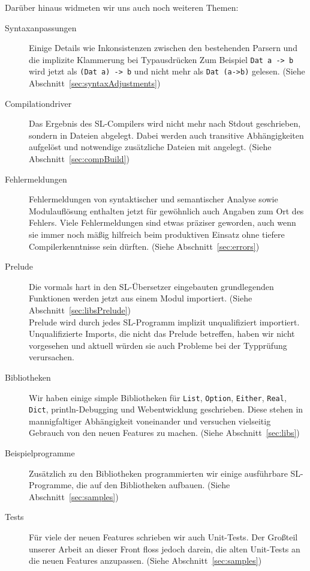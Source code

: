 \documentclass[runningheads]{llncs}
\begin{document}
Darüber hinaus widmeten wir uns auch noch weiteren Themen:

\begin{description}
 \item[Syntaxanpassungen] Einige Details wie Inkonsistenzen zwischen den
   bestehenden Parsern und die implizite Klammerung bei Typausdrücken
   Zum Beispiel \verb|Dat a -> b| wird jetzt als \verb|(Dat a) -> b| und
   nicht mehr als \verb|Dat (a->b)| gelesen.
   (Siehe Abschnitt~\ref{sec:syntaxAdjustments})
 \item[Compilationdriver] Das Ergebnis des SL-Compilers wird nicht mehr
   nach Stdout geschrieben, sondern in Dateien abgelegt. Dabei werden auch
   transitive Abhängigkeiten aufgelöst und notwendige zusätzliche Dateien
   mit angelegt. (Siehe Abschnitt~\ref{sec:compBuild})
 \item[Fehlermeldungen] Fehlermeldungen von syntaktischer und semantischer
   Analyse sowie Modulauflösung enthalten jetzt für gewöhnlich auch Angaben
   zum Ort des Fehlers. Viele Fehlermeldungen sind etwas präziser geworden,
   auch wenn sie immer noch mäßig hilfreich beim produktiven Einsatz ohne
   tiefere Compilerkenntnisse sein dürften.
   (Siehe Abschnitt~\ref{sec:errors})
 \item[Prelude] Die vormals hart in den SL-Übersetzer eingebauten grundlegenden
   Funktionen werden jetzt aus einem Modul importiert.
   (Siehe Abschnitt~\ref{sec:libsPrelude})\\
   Prelude wird durch jedes SL-Programm implizit unqualifiziert importiert.
   Unqualifizierte Imports, die nicht das Prelude betreffen, haben wir nicht
   vorgesehen und aktuell würden sie auch Probleme bei der Typprüfung
   verursachen.
 \item[Bibliotheken] Wir haben einige simple Bibliotheken für \verb|List|,
   \verb|Option|, \verb|Either|, \verb|Real|, \verb|Dict|, println-Debugging
   und Webentwicklung geschrieben. Diese stehen in mannigfaltiger Abhängigkeit
   voneinander und versuchen vielseitig Gebrauch von den neuen Features zu
   machen.
   (Siehe Abschnitt~\ref{sec:libs})
 \item[Beispielprogramme] Zusätzlich zu den Bibliotheken programmierten wir
   einige ausführbare SL-Programme, die auf den Bibliotheken aufbauen.
   (Siehe Abschnitt~\ref{sec:samples})
 \item[Tests] Für viele der neuen Features schrieben wir auch Unit-Tests.
   Der Großteil unserer Arbeit an dieser Front floss jedoch darein, die alten
   Unit-Tests an die neuen Features anzupassen.
   (Siehe Abschnitt~\ref{sec:samples})
\end{description}
\end{document}
